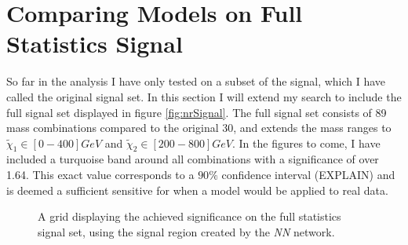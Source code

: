 \section{Comparing Models on Full Statistics Signal}
So far in the analysis I have only tested on a subset of the signal, which I have called the original signal set. In this section 
I will extend my search to include the full signal set displayed in figure \ref{fig:nrSignal}. The full signal set consists of 89 mass 
combinations compared to the original 30, and extends the mass ranges to $\tilde{\chi}_1 \in [0-400]GeV$ and $\tilde{\chi}_2 \in [200-800]GeV$.
In the figures to come, I have included a turquoise band around all combinations with a significance of over 1.64. This exact value corresponds 
to a $90\%$ confidence interval (EXPLAIN) and is deemed a sufficient sensitive for when a model would be applied to real data. 

\begin{figure}
    \caption{A grid displaying the achieved significance on the full statistics signal set, using the signal region 
    created by the \emph{NN} network.}
    \label{fig:NN_FS_MLMGridSig}
\end{figure}

